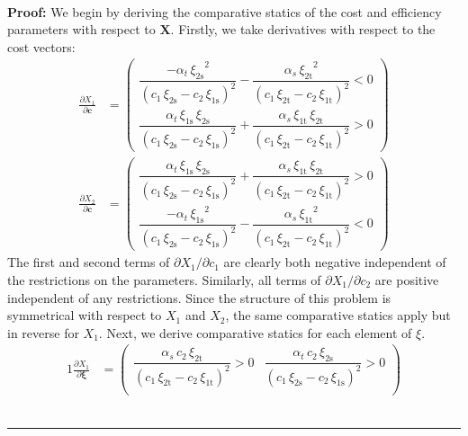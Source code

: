\documentclass[11pt,a4paper,leqno]{extarticle}
\newenvironment{proof}[1][Proof]{\noindent\textbf{#1:} }{\ \rule{0.5em}{0.5em}}
\begin{document}
	
	\hfill \\
	\begin{proof}
		We begin by deriving the comparative statics of the cost and efficiency parameters with respect to $\mathbf{X}$.   Firstly, we take derivatives with respect to the cost vectors:
		\begin{align*}
		\frac{\partial X_1}{\partial \mathbf{c}} &= 
		\begin{pmatrix}
		\dfrac{-\alpha _{t}\,{\xi _{\mathrm{2s}}}^2}{{\left(c_{1}\,\xi _{\mathrm{2s}}-c_{2}\,\xi _{\mathrm{1s}}\right)}^2}-\dfrac{\alpha _{s}\,{\xi _{\mathrm{2t}}}^2}{{\left(c_{1}\,\xi _{\mathrm{2t}}-c_{2}\,\xi _{\mathrm{1t}}\right)}^2}<0 \\
		\dfrac{\alpha _{t}\,\xi _{\mathrm{1s}}\,\xi _{\mathrm{2s}}}{{\left(c_{1}\,\xi _{\mathrm{2s}}-c_{2}\,\xi _{\mathrm{1s}}\right)}^2}+\dfrac{\alpha _{s}\,\xi _{\mathrm{1t}}\,\xi _{\mathrm{2t}}}{{\left(c_{1}\,\xi _{\mathrm{2t}}-c_{2}\,\xi _{\mathrm{1t}}\right)}^2}>0
		\end{pmatrix}\\
		\frac{\partial X_2}{\partial \mathbf{c}} &= 
		\begin{pmatrix}
		\dfrac{\alpha _{t}\,\xi _{\mathrm{1s}}\,\xi _{\mathrm{2s}}}{{\left(c_{1}\,\xi _{\mathrm{2s}}-c_{2}\,\xi _{\mathrm{1s}}\right)}^2}+\dfrac{\alpha _{s}\,\xi _{\mathrm{1t}}\,\xi _{\mathrm{2t}}}{{\left(c_{1}\,\xi _{\mathrm{2t}}-c_{2}\,\xi _{\mathrm{1t}}\right)}^2}>0 \\
		\dfrac{-\alpha _{t}\,{\xi _{\mathrm{1s}}}^2}{{\left(c_{1}\,\xi _{\mathrm{2s}}-c_{2}\,\xi _{\mathrm{1s}}\right)}^2}-\dfrac{\alpha _{s}\,{\xi _{\mathrm{1t}}}^2}{{\left(c_{1}\,\xi _{\mathrm{2t}}-c_{2}\,\xi _{\mathrm{1t}}\right)}^2}<0
		\end{pmatrix}
		\end{align*}
		The first and second terms of $\partial X_1 / \partial c_1$ are clearly both negative independent of the restrictions on the parameters. Similarly, all terms of  $\partial X_1 / \partial c_2$ are positive independent of any restrictions. Since the structure of this problem is symmetrical with respect to $X_1$ and $X_2$, the same comparative statics apply but in reverse for $X_1$. Next, we derive comparative statics for each element of $\xi$.
		\begin{alignat*}{1}
		\frac{\partial X_1}{\partial \boldsymbol{\xi}} &= 
		\begin{pmatrix}
		\dfrac{\alpha _{s}\,c_{2}\,\xi _{\mathrm{2t}}}{{\left(c_{1}\,\xi _{\mathrm{2t}}-c_{2}\,\xi _{\mathrm{1t}}\right)}^2}>0 & \dfrac{\alpha _{t}\,c_{2}\,\xi _{\mathrm{2s}}}{{\left(c_{1}\,\xi _{\mathrm{2s}}-c_{2}\,\xi _{\mathrm{1s}}\right)}^2}>0 \\

\end{pmatrix}
\end{alignat*}
\end{proof}
\end{document}
